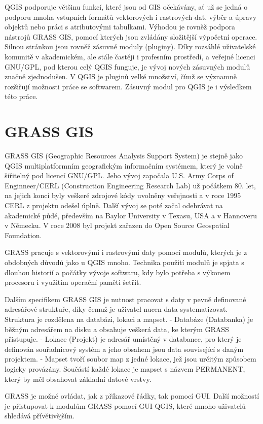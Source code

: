 QGIS podporuje většinu funkcí, které jsou od GIS očekávány, ať už se
jedná o podporu mnoha vstupních formátů vektorových i rastrových dat,
výběr a úpravy objektů nebo práci s atributovými tabulkami. Výhodou je
rovněž podpora nástrojů GRASS GIS, pomocí kterých jsou zvládány
složitější výpočetní operace.  Silnou stránkou jsou rovněž zásuvné
moduly (pluginy). Díky rozsáhlé uživatelské komunitě v akademickém,
ale stále častěji i profesním prostředí, a veřejné licenci GNU/GPL,
pod kterou celý QGIS funguje, je vývoj nových zásuvných modulů značně
zjednodušen. V QGIS je pluginů velké množství, čímž se významně
rozšiřují možnosti práce se softwarem. Zásuvný modul pro QGIS je i
výsledkem této práce.

\section{GRASS GIS}
GRASS GIS (Geographic Resources Analysis Support System) je stejně
jako QGIS multiplatformním geografickým informačním systémem, který je
volně šiřitelný pod licencí GNU/GPL. Jeho vývoj započala U.S. Army
Corps of Enginneer/CERL (Construction Engineering Research Lab) už
počátkem 80. let, na jejich konci byly veškeré zdrojové kódy uvolněny
veřejnosti a v roce 1995 CERL z projektu odešel úplně. Další vývoj se
poté začal odehrávat na akademické půdě, především na Baylor
University v Texasu, USA a v Hannoveru v Německu. V roce 2008 byl
projekt zařazen do Open Source Geospatial Foundation.

GRASS pracuje s vektorovými i rastrovými daty pomocí modulů, kterých
je z obdobných důvodů jako u QGIS mnoho. Technika použití modulů je
spjata s dlouhou historií a počátky vývoje softwaru, kdy bylo potřeba
s výkonem procesoru i využitím operační paměti šetřit.

Dalším specifikem GRASS GIS je nutnost pracovat s daty v pevně
definované adresářové struktuře, díky čemuž je uživatel nucen data
systematizovat. Struktura je rozdělena na databázi, lokaci a mapset.
- Databáze (Databanka) je běžným adresářem na disku a obsahuje veškerá
data, ke kterým GRASS přistupuje.  - Lokace (Projekt) je adresář
umístěný v databance, pro který je definován souřadnicový systém a
jeho obsahem jsou data související s daným projektem.  - Mapset tvoří
soubor map z jedné lokace, jež jsou určitým způsobem logicky
provázány. Součástí každé lokace je mapset s názvem PERMANENT, který
by měl obsahovat základní datové vrstvy.

GRASS je možné ovládat, jak z příkazové řádky, tak pomocí GUI. Další
možností je přistupovat k modulům GRASS pomocí GUI QGIS, které mnoho
uživatelů shledává přívětivějším.
